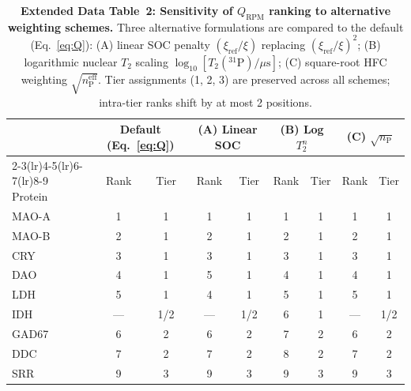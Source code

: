 \documentclass[11pt]{article}
\begin{document}

\begin{table}[p]
\centering
\caption{\textbf{Extended Data Table~2: Sensitivity of $Q_\mathrm{RPM}$ ranking to alternative weighting schemes.} Three alternative formulations are compared to the default (Eq.~\ref{eq:Q}): (A) linear SOC penalty $(\xi_\mathrm{ref}/\xi)$ replacing $(\xi_\mathrm{ref}/\xi)^2$; (B) logarithmic nuclear $T_2$ scaling $\log_{10}[T_2(^{31}\mathrm{P})/\mu\mathrm{s}]$; (C) square-root HFC weighting $\sqrt{n_\mathrm{P}^\mathrm{eff}}$. Tier assignments (1, 2, 3) are preserved across all schemes; intra-tier ranks shift by at most 2 positions.}
\label{tab:ext_sensitivity}
\small
\begin{tabular}{@{}lcccccccc@{}}
\toprule
 & \multicolumn{2}{c}{Default (Eq.~\ref{eq:Q})} & \multicolumn{2}{c}{(A) Linear SOC} & \multicolumn{2}{c}{(B) Log $T_2^n$} & \multicolumn{2}{c}{(C) $\sqrt{n_\mathrm{P}}$} \\
\cmidrule(lr){2-3}\cmidrule(lr){4-5}\cmidrule(lr){6-7}\cmidrule(lr){8-9}
Protein & Rank & Tier & Rank & Tier & Rank & Tier & Rank & Tier \\
\midrule
MAO-A  & 1 & 1 & 1 & 1 & 1 & 1 & 1 & 1 \\
MAO-B  & 2 & 1 & 2 & 1 & 2 & 1 & 2 & 1 \\
CRY    & 3 & 1 & 3 & 1 & 3 & 1 & 3 & 1 \\
DAO    & 4 & 1 & 5 & 1 & 4 & 1 & 4 & 1 \\
LDH    & 5 & 1 & 4 & 1 & 5 & 1 & 5 & 1 \\
IDH    & --- & 1/2 & --- & 1/2 & 6 & 1 & --- & 1/2 \\
GAD67  & 6 & 2 & 6 & 2 & 7 & 2 & 6 & 2 \\
DDC    & 7 & 2 & 7 & 2 & 8 & 2 & 7 & 2 \\
SRR    & 9 & 3 & 9 & 3 & 9 & 3 & 9 & 3 \\
\bottomrule
\end{tabular}
\end{table}
\end{document}
